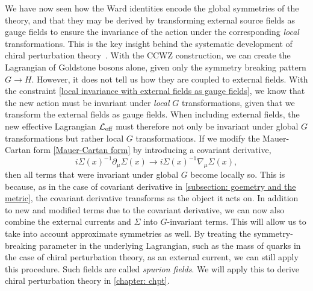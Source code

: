 We have now seen how the Ward identities encode the global symmetries of the theory, and that they may be derived by transforming external source fields as gauge fields to ensure the invariance of the action under the corresponding \emph{local} transformations.
This is the key insight behind the systematic development of chiral perturbation theory~\autocite{gasserChiralPerturbationTheory1984,gasserChiralPerturbationTheory1985,leutwylerFoundationsChiralPerturbation1994}.
With the CCWZ construction, we can create the Lagrangian of Goldstone bosons alone, given only the symmetry breaking pattern $G \rightarrow H$.
However, it does not tell us how they are coupled to external fields.
With the constraint \autoref{local invariance with external fields as gauge fields}, we know that the new action must be invariant under \emph{local} $G$ transformations, given that we transform the external fields as gauge fields.
When including external fields, the new effective Lagrangian $\mathcal{L}_\text{eff}$ must therefore not only be invariant under global $G$ transformations but rather local $G$ transformations.
If we modify the Mauer-Cartan form \autoref{Mauer-Cartan form} by introducing a covariant derivative,
%
\begin{equation}
    i\Sigma(x)^{-1} \partial_\mu \Sigma(x)
    \rightarrow i\Sigma(x)^{-1} \nabla_\mu \Sigma(x),
\end{equation}
%
then all terms that were invariant under global $G$ become locally so.
This is because, as in the case of covariant derivative in \autoref{subsection: goemetry and the metric}, the covariant derivative transforms as the object it acts on.
In addition to new and modified terms due to the covariant derivative, we can now also combine the external currents and $\Sigma$ into $G$-invariant terms.
This will allow us to take into account approximate symmetries as well.
By treating the symmetry-breaking parameter in the underlying Lagrangian, such as the mass of quarks in the case of chiral perturbation theory, as an external current, we can still apply this procedure.
Such fields are called \emph{spurion fields}.
We will apply this to derive chiral perturbation theory in \autoref{chapter: chpt}.

